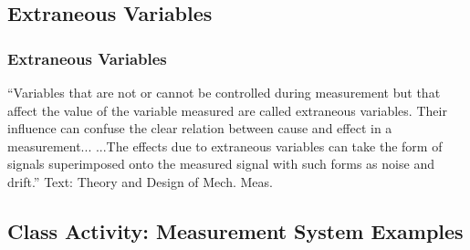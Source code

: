 \documentclass[fleqn]{beamer} %
\newcommand{\sectionIIsubsectionIVtitle}{Extraneous Variables}
\newcommand{\sectionIIsubsectionVtitle}{Class Activity: Measurement System Examples}
\begin{document}
		\subsection{\sectionIIsubsectionIVtitle}\label{sectionIIsubsectionIV}

			\begin{frame}
				\frametitle{\sectionIIsubsectionIVtitle}

				{``Variables that are not or cannot be controlled during measurement but that affect the value of the
				variable measured are called {\RD extraneous variables}. Their influence can confuse the clear relation
				between cause and effect in a measurement... ...The effects due to {\RD extraneous variables} can take the form of signals superimposed
				onto the measured signal with such forms as {\PR noise} and drift.''} \vspc
				{\tiny Text: Theory and Design of Mech. Meas.}

			\end{frame}
		
		\subsection{\sectionIIsubsectionVtitle}\label{sectionIIsubsectionV}
\end{document}
